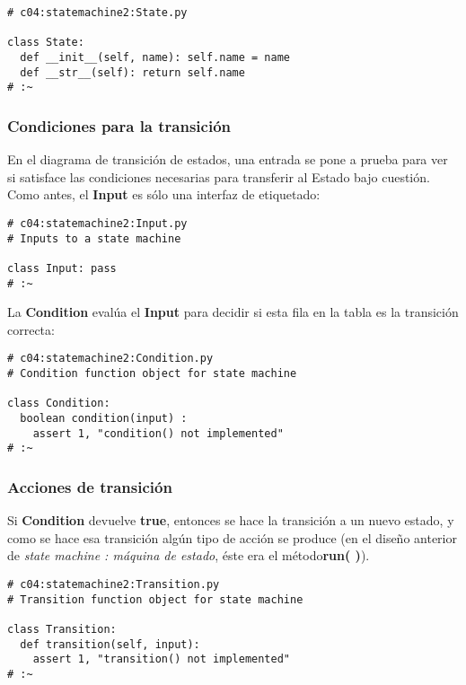  \begin{lstlisting}
# c04:statemachine2:State.py 

class State: 
  def __init__(self, name): self.name = name 
  def __str__(self): return self.name  
# :~  
 \end{lstlisting}
  
  

\subsubsection*{Condiciones para la transición}
\label{subsubsec:cplt}


En el diagrama de transición de estados, una entrada se pone a prueba para ver si satisface las condiciones necesarias para transferir al Estado bajo cuestión. Como antes, el \textbf{Input} es sólo una interfaz de etiquetado:     \newline

\begin{lstlisting}
# c04:statemachine2:Input.py 
# Inputs to a state machine 

class Input: pass 
# :~ 
\end{lstlisting}

La \textbf{Condition} evalúa el \textbf{Input} para decidir si esta fila en la tabla es la transición correcta: \newline

  \begin{lstlisting}
# c04:statemachine2:Condition.py 
# Condition function object for state machine 

class Condition: 
  boolean condition(input) :  
    assert 1, "condition() not implemented" 
# :~ 
\end{lstlisting}

\subsubsection*{Acciones de transición}
\label{subsubsec:adt}


Si \textbf{Condition} devuelve \textbf{true}, entonces se hace la transición a un nuevo estado, y como se hace esa transición algún tipo de acción se produce (en el diseño anterior de \textit{state machine : máquina de estado}, éste era el método\textbf{run( )}).     \newline

\begin{lstlisting}
# c04:statemachine2:Transition.py 
# Transition function object for state machine 

class Transition: 
  def transition(self, input): 
    assert 1, "transition() not implemented" 
# :~ 
\end{lstlisting}

